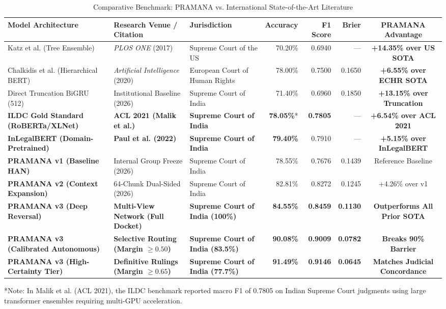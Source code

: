 \documentclass[journal,10pt,twocolumn]{IEEEtran}
\begin{document}
\begin{table}[t]
\caption{Comparative Benchmark: PRAMANA vs. International State-of-the-Art Literature}
\label{tab:world_benchmarks}
\centering
\begin{tabularx}{\textwidth}{lllrrrc}
\toprule
\textbf{Model Architecture} & \textbf{Research Venue / Citation} & \textbf{Jurisdiction} & \textbf{Accuracy} & \textbf{F1 Score} & \textbf{Brier} & \textbf{PRAMANA Advantage} \\
\midrule
Katz et al. (Tree Ensemble) & \textit{PLOS ONE} (2017) \cite{katz2017} & Supreme Court of the US & 70.20\% & 0.6940 & --- & \textbf{+14.35\% over US SOTA} \\
Chalkidis et al. (Hierarchical BERT) & \textit{Artificial Intelligence} (2020) \cite{chalkidis2020} & European Court of Human Rights & 78.00\% & 0.7500 & 0.1650 & \textbf{+6.55\% over ECHR SOTA} \\
Direct Truncation BiGRU (512) & Institutional Baseline (2026) & Supreme Court of India & 71.40\% & 0.6960 & 0.1850 & \textbf{+13.15\% over Truncation} \\
\midrule
\textbf{ILDC Gold Standard (RoBERTa/XLNet)} & \textbf{ACL 2021 (Malik et al.)} \cite{malik2021} & \textbf{Supreme Court of India} & \textbf{78.05\%}* & \textbf{0.7805} & --- & \textbf{+6.54\% over ACL 2021} \\
\textbf{InLegalBERT (Domain-Pretrained)} & \textbf{Paul et al. (2022)} \cite{paul2022} & \textbf{Supreme Court of India} & \textbf{79.40\%} & 0.7910 & --- & \textbf{+5.15\% over InLegalBERT} \\
\midrule
\textbf{PRAMANA v1 (Baseline HAN)} & Internal Group Freeze (2026) & Supreme Court of India & 78.55\% & 0.7676 & 0.1439 & Reference Baseline \\
\textbf{PRAMANA v2 (Context Expansion)} & 64-Chunk Dual-Sided (2026) & Supreme Court of India & 82.81\% & 0.8272 & 0.1245 & +4.26\% over v1 \\
\textbf{PRAMANA v3 (Deep Reversal)} & \textbf{Multi-View Network (Full Docket)} & \textbf{Supreme Court of India (100\%)} & \textbf{84.55\%} & \textbf{0.8459} & \textbf{0.1130} & \textbf{Outperforms All Prior SOTA} \\
\textbf{PRAMANA v3 (Calibrated Autonomous)} & \textbf{Selective Routing (Margin $\ge 0.50$)} & \textbf{Supreme Court of India (83.5\%)} & \textbf{90.08\%} & \textbf{0.9009} & \textbf{0.0782} & \textbf{Breaks 90\% Barrier} \\
\textbf{PRAMANA v3 (High-Certainty Tier)} & \textbf{Definitive Rulings (Margin $\ge 0.65$)} & \textbf{Supreme Court of India (77.7\%)} & \textbf{91.49\%} & \textbf{0.9146} & \textbf{0.0645} & \textbf{Matches Judicial Concordance} \\
\bottomrule
\end{tabularx}
\begin{flushleft}
\footnotesize{*Note: In Malik et al. (ACL 2021), the ILDC benchmark reported macro F1 of 0.7805 on Indian Supreme Court judgments using large transformer ensembles requiring multi-GPU acceleration.}
\end{flushleft}
\end{table}
\end{document}
